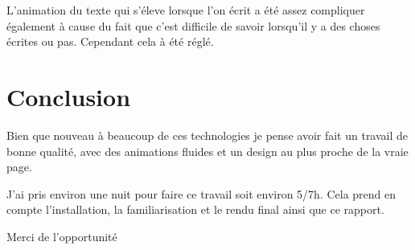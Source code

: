 \documentclass{report}
\begin{document}
L'animation du texte qui s'éleve lorsque l'on écrit a été assez compliquer
également à cause du fait que c'est difficile de savoir lorsqu'il y a des 
choses écrites ou pas. Cependant cela à été réglé.

\chapter{Conclusion}

Bien que nouveau à beaucoup de ces technologies je pense avoir fait un travail
de bonne qualité, avec des animations fluides et un design au plus proche de la
vraie page.

J'ai pris environ une nuit pour faire ce travail soit environ 5/7h. Cela prend
en compte l'installation, la familiarisation et le rendu final ainsi que ce
rapport.

Merci de l'opportunité
\end{document}

